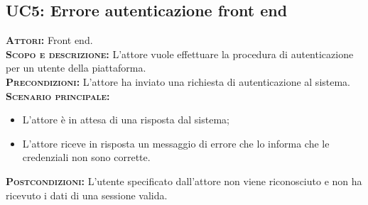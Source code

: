 \subsection{UC5: Errore autenticazione front end}
\label{sec:UC5}
\textsc{\textbf{Attori:}} Front end.\\
\textsc{\textbf{Scopo e descrizione:}} L'attore vuole effettuare la procedura di autenticazione per un utente della piattaforma.\\
\textsc{\textsc{\textbf{Precondizioni:}}} L'attore ha inviato una richiesta di autenticazione al sistema.\\
\textsc{\textbf{Scenario principale:}} 
\begin{itemize}
    \item L'attore è in attesa di una risposta dal sistema;
    \item L'attore riceve in risposta un messaggio di errore che lo informa che le credenziali non sono corrette.
\end{itemize}
\textsc{\textbf{Postcondizioni:}} L'utente specificato dall'attore non viene riconosciuto e non ha ricevuto i dati di una sessione valida.


